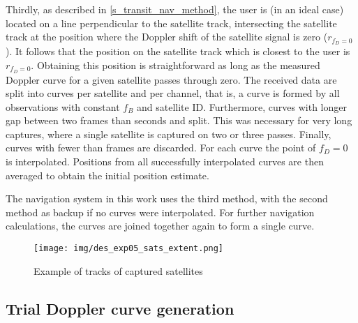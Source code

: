 Thirdly, as described in \autoref{s_transit_nav_method}, the user is (in an ideal case) located on a line perpendicular to the satellite track, intersecting the satellite track at the position where the Doppler shift of the satellite signal is zero ($r_{f_D = 0}$). It follows that the position on the satellite track which is closest to the user is $r_{f_D = 0}$. Obtaining this position is straightforward as long as the measured Doppler curve for a given satellite passes through zero. The received data are split into curves per satellite and per channel, that is, a curve is formed by all observations with constant $f_B$ and satellite ID. Furthermore, curves with longer gap between two frames than  seconds and split. This was necessary for very long captures, where a single satellite is captured on two or three passes. Finally, curves with fewer than  frames are discarded. For each curve the point of $f_D = 0$ is interpolated. Positions from all successfully interpolated curves are then averaged to obtain the initial position estimate.



The navigation system in this work uses the third method, with the second method as backup if no curves were interpolated. %
For further navigation calculations, the curves are joined together again to form a single curve.


\begin{figure}
    \centering
    \texttt{[image: img/des\_exp05\_sats\_extent.png]}
    \caption{Example of tracks of captured satellites}
    \label{f_des_exp05_sats_extent}
\end{figure}


\subsection{Trial Doppler curve generation}

